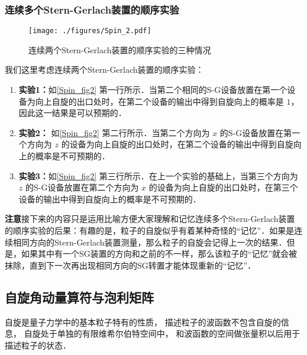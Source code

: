 \subsubsection{连续多个Stern-Gerlach装置的顺序实验}
\begin{figure}[ht]
\centering
\texttt{[image: ./figures/Spin\_2.pdf]}
\caption{连续两个Stern-Gerlach装置的顺序实验的三种情况} \label{Spin_fig2}
\end{figure}
我们这里考虑连续两个Stern-Gerlach装置的顺序实验：
\begin{enumerate}
\item \textbf{实验1：}如\autoref{Spin_fig2} 第一行所示．当第二个相同的S-G设备放置在第一个设备为向上自旋的出口处时，在第二个设备的输出中得到自旋向上的概率是 $1$，因此这一结果是可以预期的．

\item  \textbf{实验2：} 如\autoref{Spin_fig2} 第二行所示．当第二个方向为 $x$ 的S-G设备放置在第一个方向为 $z$ 的设备为向上自旋的出口处时，在第二个设备的输出中得到自旋向上的概率是不可预期的．

\item  \textbf{实验3：}如\autoref{Spin_fig2} 第三行所示．在上一个实验的基础上，当第三个方向为 $z$ 的S-G设备放置在第二个方向为 $x$ 的设备为向上自旋的出口处时，在第三个设备的输出中得到自旋向上的概率是不可预期的．
\end{enumerate}

\textbf{注意}接下来的内容只是运用比喻方便大家理解和记忆连续多个Stern-Gerlach装置的顺序实验的后果：有趣的是，粒子的自旋似乎有着某种奇怪的“记忆”．如果是连续相同方向的Stern-Gerlach装置测量，那么粒子的自旋会记得上一次的结果．但是，如果其中有一个SG装置的方向和之前的不一样，那么该粒子的“记忆”就会被抹除，直到下一次再出现相同方向的SG转置才能体现重新的“记忆”．

\subsection{自旋角动量算符与泡利矩阵}

自旋是量子力学中的基本粒子特有的性质， 描述粒子的波函数不包含自旋的信息， 自旋处于单独的有限维希尔伯特空间中， 和波函数的空间做张量积以后用于描述粒子的状态．

